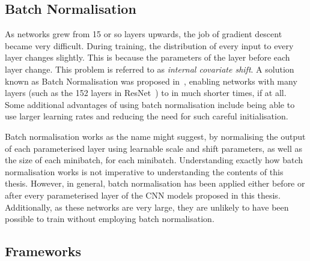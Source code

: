 


\subsection{Batch Normalisation}

As networks grew from 15 or so layers upwards, the job of gradient
descent became very difficult. During training, the distribution of
every input to every layer changes slightly. This is because the
parameters of the layer before each layer change. This problem is
referred to as \textit{internal covariate shift}. A solution known as
Batch Normalisation was proposed in~\cite{ioffe2015batch}, enabling
networks with many layers (such as the 152 layers in
ResNet~\cite{he2015deep}) to in much shorter times, if at all. Some
additional advantages of using batch normalisation include being able
to use larger learning rates and reducing the need for such careful
initialisation.

Batch normalisation works as the name might suggest, by normalising
the output of each parameterised layer using learnable scale and shift
parameters, as well as the size of each minibatch, for each
minibatch. Understanding exactly how batch normalisation works is not
imperative to understanding the contents of this thesis. However, in
general, batch normalisation has been applied either before or after
every parameterised layer of the CNN models proposed in this
thesis. Additionally, as these networks are very large, they are
unlikely to have been possible to train without employing batch
normalisation.


\subsection{Frameworks}

